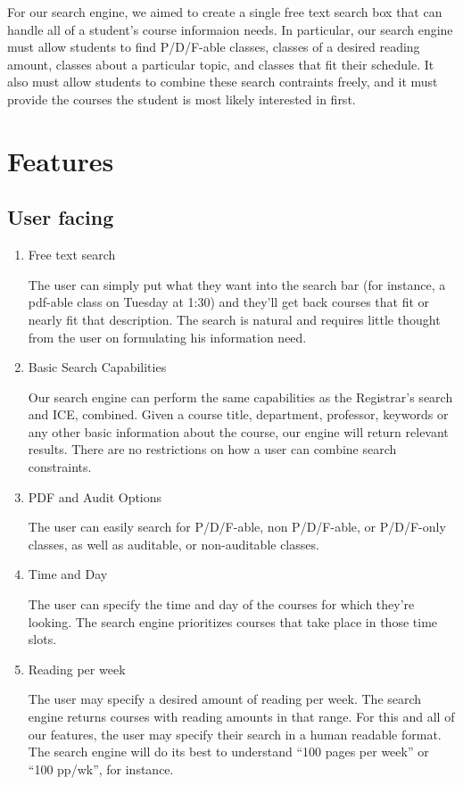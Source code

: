 \documentclass[12pt,letterpaper]{article}
\begin{document}
	For our search engine, we aimed to create a single free text search box that can handle all of a student's course informaion needs. In particular, our search engine must allow students to find P/D/F-able classes, classes of a desired reading amount, classes about a particular topic, and classes that fit their schedule. It also must allow students to combine these search contraints freely, and it must provide the courses the student is most likely interested in first.
	
\section{Features}
	\subsection{User facing}
		\begin{enumerate}
			\item Free text search
			
			The user can simply put what they want into the search bar (for instance, a pdf-able class on Tuesday at 1:30) and they'll get back courses that fit or nearly fit that description. The search is natural and requires little thought from the user on formulating his information need. 
			
			\item Basic Search Capabilities
			
			Our search engine can perform the same capabilities as the Registrar's search and ICE, combined. Given a course title, department, professor, keywords or any other basic information about the course, our engine will return relevant results. There are no restrictions on how a user can combine search constraints.
			
			\item PDF and Audit Options
			
			The user can easily search for P/D/F-able, non P/D/F-able, or P/D/F-only classes, as well as auditable, or non-auditable classes.
			
			\item Time and Day
			
			The user can specify the time and day of the courses for which they're looking. The search engine prioritizes courses that take place in those time slots.
			
			\item Reading per week
			
			The user may specify a desired amount of reading per week. The search engine returns courses with reading amounts in that range. For this and all of our features, the user may specify their search in a human readable format. The search engine will do its best to understand ``100 pages per week'' or ``100 pp/wk'', for instance.
			
		\end{enumerate}
\end{document}
